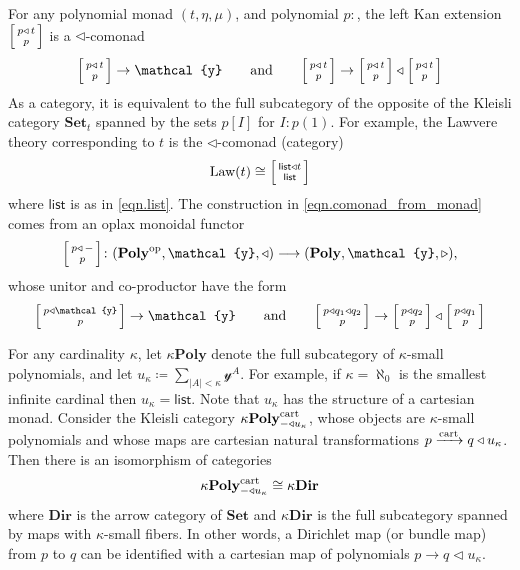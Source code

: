 \documentclass[11pt, one side, article]{memoir}
\makeatletter
\theoremstyle{definition}
\theoremstyle{plain}
\newcommand{\Cat}[1]{\mathbf{#1}}%
\newcommand{\Fun}[1]{\mathsf{#1}}%
\newcommand{\too}{\longrightarrow}
\newcommand{\To}[2][]{\xrightarrow[#1]{\tn{$#2$}}}
\newcommand{\op}{^\tn{op}}
\newcommand{\tn}[1]{\textnormal{#1}}
\newcommand{\nn}{\mathbb{N}}
\newcommand{\smset}{\Cat{Set}}
\newcommand{\List}{\Fun{list}}
\newcommand{\yon}{{\mathcal{y}}}
\newcommand{\poly}{\Cat{Poly}}
\newcommand{\cart}{\tn{cart}}
\newcommand{\polycart}{\poly^\cart}
\newcommand{\0}{\textsf{0}}
\newcommand{\1}{\tn{\textsf{1}}}
\newcommand{\tri}{\mathbin{\triangleleft}}
\newcommand{\irt}{\mathbin{\triangleright}}
\newcommand{\biglens}[2]{
     \begin{bmatrix}{\vphantom{f_f^f}#2} \\ {\vphantom{f_f^f}#1} \end{bmatrix}
}
\newcommand{\littlelens}[2]{
     \begin{bsmallmatrix}{\vphantom{f}#2} \\ {\vphantom{f}#1} \end{bsmallmatrix}
}
\newcommand{\lens}[2]{
  \relax\if@display
     \biglens{#1}{#2}
  \else
     \littlelens{#1}{#2}
  \fi
}
\newcommand{\hh}[2][]{#1 \tn{#2} #1}
\newcommand{\qqand}{\hh[\qquad]{and}}
\makeatother
\begin{document}

For any polynomial monad $(t,\eta,\mu)$, and polynomial $p\colon$, the left Kan extension $\lens{p}{p\tri\, t}$ is a $\tri$-comonad
\begin{equation}\label{eqn.comonad_from_monad}
  \lens{p}{p\tri\, t}\to\yon
  \qqand
  \lens{p}{p\tri\, t}\to\lens{p}{p\tri\, t}\tri\lens{p}{p\tri\, t}
\end{equation}
As a category, it is equivalent to the full subcategory of the opposite of the Kleisli category $\smset_t$ spanned by the sets $p[I]$ for $I:p(1)$. For example, the Lawvere theory corresponding to $t$ is the $\tri$-comonad (category)
\begin{equation}
	\text{Law}(t)\cong\lens{\List}{\List\tri t}
\end{equation}
where $\List$ is as in \eqref{eqn.list}. The construction in \eqref{eqn.comonad_from_monad} comes from an oplax monoidal functor
\begin{equation}
	\lens{p}{p\tri\,-}\colon(\poly\op,\yon,\tri)\too(\poly,\yon,\irt),
\end{equation}
whose unitor and co-productor have the form
\begin{equation}
	\lens{p}{p\tri\yon}\to\yon
  \qqand
	\lens{p}{p\tri q_1\tri q_2}\to\lens{p}{p\tri q_2}\tri\lens{p}{p\tri q_1}
\end{equation}

For any cardinality $\kappa$, let $\kappa\poly$ denote the full subcategory of $\kappa$-small polynomials, and let $u_\kappa\coloneqq\sum_{|A|<\kappa}\yon^A$. For example, if $\kappa=\aleph_0$ is the smallest infinite cardinal then $u_\kappa=\List$. Note that $u_\kappa$ has the structure of a cartesian monad. Consider the Kleisli category $\kappa\polycart_{-\tri u_\kappa}$, whose objects are $\kappa$-small polynomials and whose maps are cartesian natural transformations $p\To{\tn{cart}} q\tri u_\kappa$. Then there is an isomorphism of categories
\begin{equation}
	\kappa\polycart_{-\tri u_\kappa}\cong\kappa\Cat{Dir}
\end{equation}
where $\Cat{Dir}$ is the arrow category of $\smset$ and $\kappa\Cat{Dir}$ is the full subcategory spanned by maps with $\kappa$-small fibers. In other words, a Dirichlet map (or bundle map) from $p$ to $q$ can be identified with a cartesian map of polynomials $p\to q\tri u_\kappa$.
\end{document}
